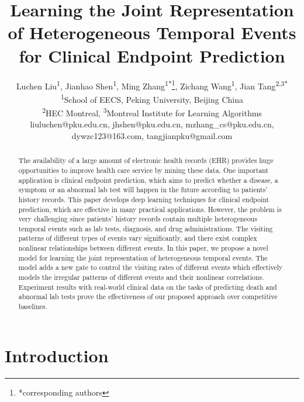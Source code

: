 \documentclass[letterpaper]{article} %
\begin{document}
\renewcommand\footnotemark{}
\title{Learning the Joint Representation of Heterogeneous Temporal Events
\\for Clinical Endpoint Prediction}
\author{Luchen Liu\textsuperscript{1}, Jianhao Shen\textsuperscript{1}, Ming Zhang\textsuperscript{1*}\thanks{*corresponding authors}, Zichang Wang\textsuperscript{1}, Jian Tang\textsuperscript{2,3*} \\
\textsuperscript{1}School of EECS, Peking University, Beijing China \\
\textsuperscript{2}HEC Montreal, \textsuperscript{3}Montreal Institute for Learning Algorithms \\
liuluchen@pku.edu.cn,
jhshen@pku.edu.cn,
mzhang\_cs@pku.edu.cn,
dywzc123@163.com,
tangjianpku@gmail.com
}
\maketitle
\begin{abstract}
The availability of a large amount of electronic health records (EHR) provides huge opportunities to improve health care service by mining these data. One important application is clinical endpoint prediction, which aims to predict whether a disease, a symptom or an abnormal lab test will happen in the future according to patients' history records. This paper develops deep learning techniques for clinical endpoint prediction, which are  effective in many practical applications. However, the problem is very challenging since patients' history records contain multiple heterogeneous temporal events such as lab tests, diagnosis, and drug administrations. The visiting patterns of different types of events vary significantly, and there exist complex nonlinear relationships between different events. In this paper, we propose a novel model for learning the joint representation of heterogeneous temporal events.
The  model adds a new gate to control the visiting rates of different events which effectively models the irregular patterns of different events and their nonlinear correlations.
Experiment results with real-world clinical data on the tasks of predicting death and abnormal lab tests prove the effectiveness of our proposed approach over competitive baselines.





\end{abstract}

\section{Introduction}
\end{document}
